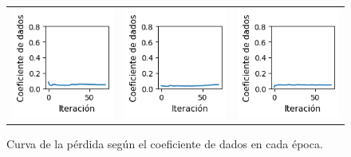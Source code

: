 \begin{figure}[!b]
\begin{tabular}{ccc}
        \includegraphics[width=4cm]{../Plots/dl_epoch_6.png} &
        \includegraphics[width=4cm]{../Plots/dl_epoch_7.png} &
        \includegraphics[width=4cm]{../Plots/dl_epoch_8.png} \\

    \end{tabular}        
    \caption{Curva de la pérdida según el coeficiente de dados en cada época.}
    \label{fig:dice_loss_epochs}
\end{figure}

